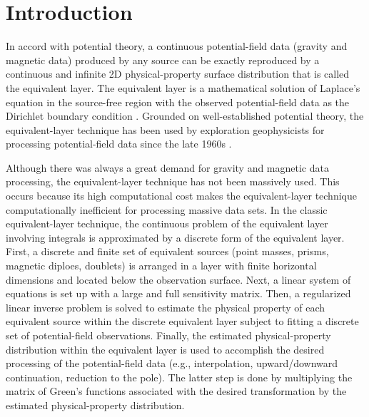 \section{Introduction}
In accord with potential theory, a continuous potential-field data (gravity and magnetic data) produced by any source can be exactly reproduced by a continuous and infinite 2D physical-property surface distribution that is called the equivalent layer. The equivalent layer is a mathematical solution of Laplace’s equation in the source-free region with the observed potential-field data as the Dirichlet boundary condition \citep{kellogg1929}. Grounded on well-established potential theory, the equivalent-layer technique has been used by exploration geophysicists for processing potential-field data since the late 1960s \citep{dampney1969}. 

Although there was always a great demand for gravity and magnetic data processing, the equivalent-layer technique has not been massively used. This occurs because its high computational cost makes the equivalent-layer technique computationally inefficient for processing massive data sets. In the classic equivalent-layer technique, the continuous problem of the equivalent layer involving integrals is approximated by a discrete form of the equivalent layer. First, a discrete and finite set of equivalent sources (point masses, prisms, magnetic diploes, doublets) is arranged in a layer with finite horizontal dimensions and located below the observation surface. Next, a linear system of equations is set up with a large and full sensitivity matrix. Then, a regularized linear inverse problem is solved to estimate the physical property of each equivalent source within the discrete equivalent layer subject to fitting a discrete set of potential-field observations. 
Finally, the estimated physical-property distribution within the equivalent layer is used to accomplish the desired processing of the potential-field data (e.g., interpolation, upward/downward continuation,  reduction to the pole). The latter step is done by multiplying the matrix of Green’s functions associated with the desired transformation by the estimated physical-property distribution. 


